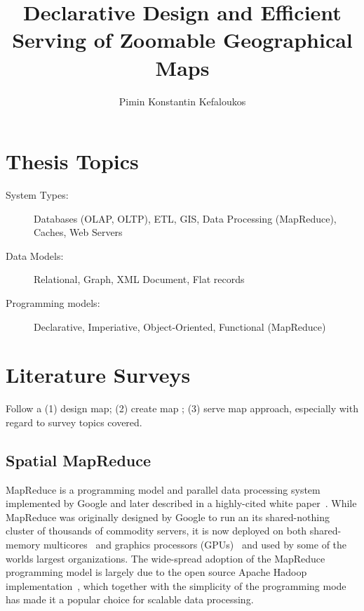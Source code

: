 \documentclass[11pt, oneside]{report}   	%
\title{Declarative Design and Efficient Serving of Zoomable Geographical Maps}
\author{Pimin Konstantin Kefaloukos}
\begin{document}
\maketitle

\tableofcontents

\chapter{Thesis Topics}

\begin{description}
\item [System Types:] Databases (OLAP, OLTP), ETL, GIS, Data Processing (MapReduce), Caches, Web Servers
\item [Data Models:] Relational, Graph, XML Document, Flat records 
\item [Programming models:] Declarative, Imperiative, Object-Oriented, Functional (MapReduce)
\end{description}

\chapter{Literature Surveys}

Follow a (1) design map; (2) create map ; (3) serve map approach, especially with regard to survey topics covered. 


\section{Spatial MapReduce}


MapReduce is a programming model and parallel data processing system implemented by Google and later described in a highly-cited white paper~\cite{dean2008mapreduce}. While MapReduce was originally designed by Google to run an its shared-nothing cluster of thousands of commodity servers, it is now deployed on both shared-memory multicores~\cite{ranger2007multicore} and graphics processors (GPUs)~\cite{he2008mapreducegpu} and used by some of the worlds largest organizations. The wide-spread adoption of the MapReduce programming model is largely due to the open source Apache Hadoop implementation~\cite{apachehadoop}, which together with the simplicity of the programming mode has made it a popular choice for scalable data processing. 
\end{document}
